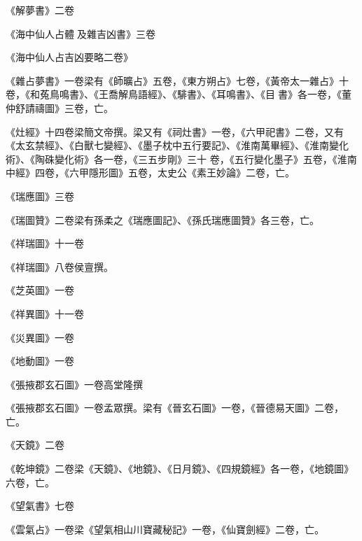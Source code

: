 \begin{pinyinscope}
 《解夢書》二卷



 《海中仙人占體及雜吉凶書》三卷



 《海中仙人占吉凶要略二卷》



 《雜占夢書》一卷梁有《師曠占》五卷，《東方朔占》七卷，《黃帝太一雜占》十卷，《和菟鳥鳴書》、《王喬解鳥語經》、《騑書》、《耳鳴書》、《目書》各一卷，《董仲舒請禱圖》三卷，亡。



 《灶經》十四卷梁簡文帝撰。梁又有《祠灶書》一卷，《六甲祀書》二卷，又有《太玄禁經》、《白獸七變經》、《墨子枕中五行要記》、《淮南萬畢經》、《淮南變化術》、《陶硃變化術》各一卷，《三五步剛》三十
 卷，《五行變化墨子》五卷，《淮南中經》四卷，《六甲隱形圖》五卷，太史公《素王妙論》二卷，亡。



 《瑞應圖》三卷



 《瑞圖贊》二卷梁有孫柔之《瑞應圖記》、《孫氏瑞應圖贊》各三卷，亡。



 《祥瑞圖》十一卷



 《祥瑞圖》八卷侯亶撰。



 《芝英圖》一卷



 《祥異圖》十一卷



 《災異圖》一卷



 《地動圖》一卷



 《張掖郡玄石圖》一卷高堂隆撰



 《張掖郡玄石圖》一卷孟眾撰。梁有《晉玄石圖》一卷，《晉德易天圖》二卷，亡。



 《天鏡》二卷



 《乾坤鏡》二卷梁《天鏡》、《地鏡》、《日月鏡》、《四規鏡經》各一卷，《地鏡圖》六卷，亡。



 《望氣書》七卷



 《雲氣占》一卷梁《望氣相山川寶藏秘記》一卷，《仙寶劍經》二卷，亡。




\end{pinyinscope}
